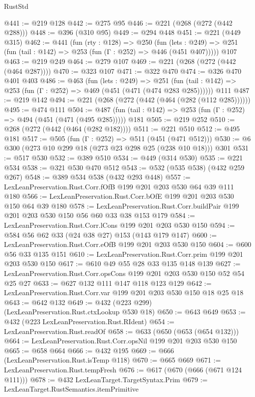 \begin{lexlean}{RustStd}
\begin{coremodule}
@441 := @219 @128
@442 := @275 @95
@446 := @221 (@268 (@272 (@442 @288)))
@448 := @396 (@310 @95)
@449 := @294 @448
@451 := @221 (@449 @315)
@462 := @441
    (fun (rty : @128) =>
    @250
      (fun (lets : @249) => @251 (fun (tail : @142) => @253 (fun (Γ : @252) => @446 (@451 @407)))))
    @107
@463 := @219 @249
@464 := @279 @107
@469 := @221 (@268 (@272 (@442 (@464 @287))))
@470 := @323 @107
@471 := @322 @470
@474 := @326 @470 @401 @403
@486 := @463
    (fun (lets : @249) =>
    @251 (fun (tail : @142) => @253 (fun (Γ : @252) => @469 (@451 (@471 (@474 @283 @285))))))
    @111
@487 := @219 @142
@494 := @221 (@268 (@272 (@442 (@464 (@282 (@112 @285))))))
@495 := @474 @111
@504 := @487 (fun (tail : @142) => @253 (fun (Γ : @252) => @494 (@451 (@471 (@495 @285))))) @181
@505 := @219 @252
@510 := @268 (@272 (@442 (@464 (@282 @182))))
@511 := @221 @510
@512 := @495 @181
@517 := @505 (fun (Γ : @252) => @511 (@451 (@471 @512)))
@530 := @6 @300 (@273 @10 @299 @18 (@273 @23 @298 @25 (@238 @10 @18))) @301
@531 := @517 @530
@532 := @389 @510
@534 := @449 (@314 @530)
@535 := @221 @534
@538 := @321 @530 @470 @512
@543 := @532 (@535 @538) (@432 @259 @267)
@548 := @389 @534 @538 (@432 @293 @448)
@557 := LexLeanPreservation.Rust.Corr.fOfB @199 @201 @203 @530 @64 @39 @111 @180
@566 := LexLeanPreservation.Rust.Corr.bOfE @199 @201 @203 @530 @150 @64 @39 @180
@578 := LexLeanPreservation.Rust.Corr.buildPair @199 @201 @203 @530 @150 @56 @60 @33 @38 @153 @179
@584 := LexLeanPreservation.Rust.Corr.lCons @199 @201 @203 @530 @150
@594 := @584 @56 @62 @33 (@24 @38 @27) @153 (@143 @179 @147)
@600 := LexLeanPreservation.Rust.Corr.eOfB @199 @201 @203 @530 @150
@604 := @600 @56 @33 @135 @151
@610 := LexLeanPreservation.Rust.Corr.prim @199 @201 @203 @530 @150
@617 := @610 @49 @55 @28 @33 @135 @148 @139
@627 := LexLeanPreservation.Rust.Corr.opsCons @199 @201 @203 @530 @150 @52 @54 @25 @27
@633 := @627 @132 @111 @147 @118 @123 @129
@642 := LexLeanPreservation.Rust.Corr.var @199 @201 @203 @530 @150 @18 @25 @18
@643 := @642 @132
@649 := @432 (@223 @299) (LexLeanPreservation.Rust.ctxLookup @530 @18)
@650 := @643 @649
@653 := @432 (@223 LexLeanPreservation.Rust.RIdent)
@654 := LexLeanPreservation.Rust.readOf
@658 := @633 (@650 (@653 (@654 @132)))
@664 := LexLeanPreservation.Rust.Corr.opsNil @199 @201 @203 @530 @150
@665 := @658 @664
@666 := @432 @195
@669 := @666 (LexLeanPreservation.Rust.isTemp @118)
@670 := @665 @669
@671 := LexLeanPreservation.Rust.tempFresh
@676 := @617 (@670 (@666 (@671 @124 @111)))
@678 := @432 LexLeanTarget.TargetSyntax.Prim
@679 := LexLeanTarget.RustSemantics.itemPrimitive

\end{coremodule}
\end{lexlean}
